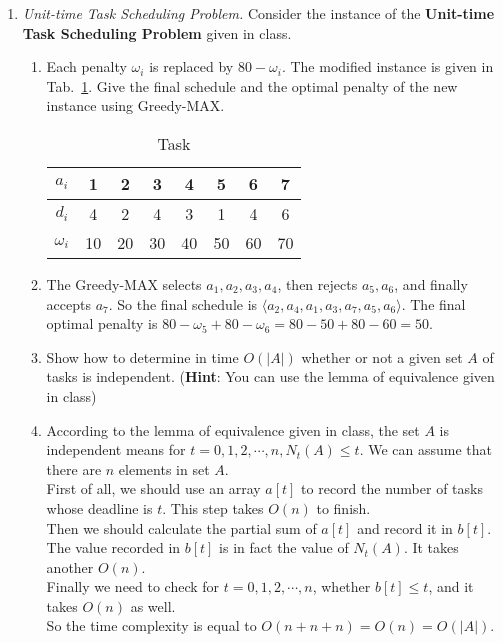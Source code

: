\documentclass[12pt,a4paper]{article}
\makeatletter
\newtheorem*{solution}{Solution}
\theoremstyle{definition}
\renewenvironment{solution}[1][Solution] {\par\pushQED{\qed}\normalfont\topsep6\p@\@plus6\p@\relax\trivlist\item[\hskip\labelsep\bfseries#1\@addpunct{.}]\ignorespaces}{\popQED\endtrivlist\@endpefalse} \makeatother
\makeatother
\begin{document}
\begin{enumerate}
\begin{enumerate}
\begin{solution}
	     
	    \end{solution}

\end{enumerate}
\item \textit{Unit-time Task Scheduling Problem.} Consider the instance of the \textbf{Unit-time Task Scheduling Problem} given in class. 
    \begin{enumerate}
        \item Each penalty $\omega_{i}$ is replaced by $80-\omega_{i}$. The modified instance is given in Tab.~\ref{tab:1}. Give the final schedule and the optimal penalty of the new instance using Greedy-MAX.
		\begin{table}[H]
			\setlength{\abovecaptionskip}{0.cm}
			\setlength{\belowcaptionskip}{0.5cm}
			\centering
			\caption{Task}
			\label{tab:1}			
			\begin{tabular}{|c|ccccccc|}
				\hline
				$ a_{i} $&1&2&3&4&5&6&7\\
				\hline
				$ d_{i} $&4&2&4&3&1&4&6\\
                \hline
                $ \omega_{i} $&10&20&30&40&50&60&70\\
				\hline
			\end{tabular}
		\end{table}
	        \begin{solution}
	            The Greedy-MAX selects $a_1,a_2,a_3,a_4$, then rejects $a_5, a_6$, and finally accepts $a_7$. So the final schedule is $\langle a_2,a_4,a_1,a_3,a_7,a_5,a_6\rangle$. The final optimal penalty is $80 - \omega_5 + 80 - \omega_6 = 80 - 50 + 80 - 60 = 50$.
	        \end{solution}
        \item Show how to determine in time $O(|A|)$ whether or not a given set $A$ of tasks is independent. (\textbf{Hint}: You can use the lemma of equivalence given in class)
 	        \begin{solution}
                According to the lemma of equivalence given in class, the set $A$ is independent means for $t = 0,1,2,\cdots,n,N_t(A) \leqslant t$. We can assume that there are $n$ elements in set $A$. \\First of all, we should use an array $a[t]$ to record the number of tasks whose deadline is $t$. This step takes $O(n)$ to finish. \\Then we should calculate the partial sum of $a[t]$ and record it in $b[t]$. The value recorded in $b[t]$ is in fact the value of $N_t(A)$. It takes another $O(n)$. \\Finally we need to check for $t = 0,1,2,\cdots,n$, whether $b[t] \leqslant t$, and it takes $O(n)$ as well. \\So the time complexity is equal to $O(n+n+n) = O(n) = O(|A|)$.
            \end{solution}
    \end{enumerate}


\end{enumerate}
\end{document}
